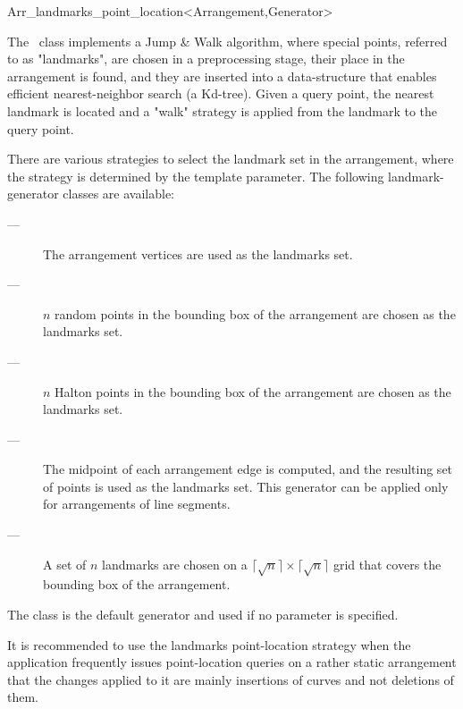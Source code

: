 
\ccRefPageBegin

\begin{ccRefClass}{Arr_landmarks_point_location<Arrangement,Generator>}
\label{arr_ref:lm_pl}

The \ccRefName\ class implements a Jump \& Walk algorithm, where special
points, referred to as "landmarks", are chosen in a preprocessing stage,
their place in the arrangement is found, and they are inserted into a
data-structure that enables efficient nearest-neighbor search (a
{\sc Kd}-tree). Given a query point, the nearest landmark is located and a
"walk" strategy is applied from the landmark to the query point.

There are various strategies to select the landmark set in the
arrangement, where the strategy is determined by the
 template parameter. The following landmark-generator
classes are available:
\begin{description}
\item[ ---]
The arrangement vertices are used as the landmarks set.

\item[ ---]
$n$ random points in the bounding box of the arrangement are chosen
as the landmarks set.

\item[ ---]
$n$ Halton points in the bounding box of the arrangement are chosen
as the landmarks set.

\item[ ---]
The midpoint of each arrangement edge is computed, and the resulting
set of points is used as the landmarks set. This generator can be applied
only for arrangements of line segments.

\item[ ---]
A set of $n$ landmarks are chosen on a
$\lceil \sqrt{n} \rceil \times \lceil \sqrt{n} \rceil$
grid that covers the bounding box of the arrangement.
\end{description}
The  class is the default generator
and used if no  parameter is specified.

It is recommended to use the landmarks point-location strategy
when the application frequently issues point-location queries on a
rather static arrangement that the changes applied to it are mainly
insertions of curves and not deletions of them.


\ccIsModel
   \\

\end{ccRefClass}

\ccRefPageEnd
